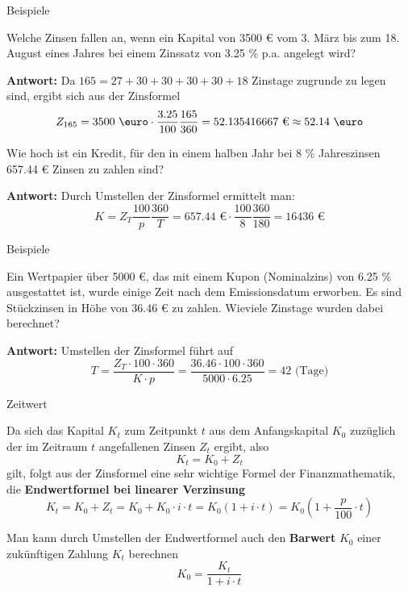\begin{frame}{Beispiele}
	\begin{example}
		Welche Zinsen fallen an, wenn ein Kapital von 3500 € vom 3. März bis zum 18. August eines Jahres bei einem Zinssatz von 3.25 \% p.a. angelegt wird?	 
		
		\textbf{Antwort:} Da $165=27+30+30+30+30+18$ Zinstage zugrunde zu legen sind, ergibt sich aus der Zinsformel
		\[
		Z_{165} = 3500\mbox{ \euro} \cdot \frac{3.25}{100} \frac{165}{360} = 52.135416667 \mbox{ €} \approx 52.14 \mbox{ \euro}
		\] 
	\end{example}
	\begin{example}
		Wie hoch ist ein Kredit, für den in einem halben Jahr bei 8 \% Jahreszinsen 657.44 € Zinsen zu zahlen sind?
		
		\textbf{Antwort:} Durch Umstellen der Zinsformel ermittelt man:
		\[
		K=Z_{T} \frac{100}{p} \frac{360}{T} = 657.44 \mbox{ €} \cdot \frac{100}{8} \frac{360}{180} = 16 436 \mbox{ €}
		\]
	\end{example}
\end{frame}

\begin{frame}{Beispiele}
	\begin{example}
		Ein Wertpapier über 5000 €, das mit einem Kupon (Nominalzins) von 6.25 \% ausgestattet ist, wurde einige Zeit nach dem Emissionsdatum erworben. Es sind Stückzinsen in Höhe von 36.46 € zu zahlen. Wieviele Zinstage wurden dabei berechnet?
		
		\textbf{Antwort:} Umstellen der Zinsformel führt auf
		\[
			T = \frac{Z_{T} \cdot 100 \cdot 360}{K \cdot p} = \frac{36.46 \cdot 100 \cdot 360}{5000 \cdot 6.25} = 42 \mbox{ (Tage)}
		\] 
	\end{example}
\end{frame}

\begin{frame}{Zeitwert}
	\begin{definition}	
		Da sich das Kapital $K_{t}$ zum Zeitpunkt $t$ aus dem Anfangskapital $K_{0}$ zuzüglich der im Zeitraum $t$ angefallenen Zinsen $Z_{t}$ ergibt, also 
		\[
			K_{t} = K_{0} + Z_{t}
		\]
		gilt, folgt aus der Zinsformel eine sehr wichtige Formel der Finanzmathematik, die \textbf{Endwertformel bei linearer Verzinsung}
		\[
			K_{t} = K_{0} + Z_{t} = K_{0} + K_{0} \cdot i \cdot t = K_{0} \left( 1 + i \cdot t \right) = K_{0} \left( 1 + \frac{p}{100} \cdot t \right)
		\]
	\end{definition}
	\begin{bemerkung}
		Man kann durch Umstellen der Endwertformel auch den \textbf{Barwert} $K_{0}$ einer zukünftigen Zahlung $K_{t}$ berechnen
		\[
			K_{0} = \frac{K_{t}}{1+i \cdot t}
		\]
	\end{bemerkung}
\end{frame}

